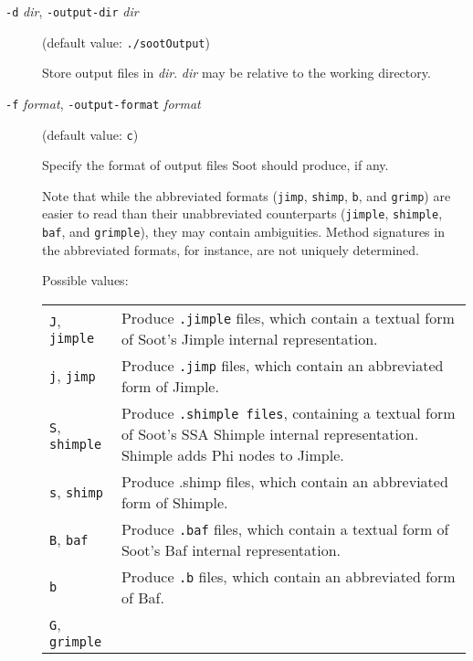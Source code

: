 \documentclass{article}
\begin{document}
\begin{description}

  \item[
  {\tt -d}{ \it dir}, 
  {\tt -output-dir}{ \it dir}]

(default value: {\tt ./sootOutput})

Store output files in {\it dir}. {\it dir} may be
relative to the working directory.



  \item[
  {\tt -f}{ \it format}, 
  {\tt -output-format}{ \it format}]

(default value: {\tt c})


\par

Specify the format of output files Soot should produce, if
any.

\par

Note that while the abbreviated formats ({\tt jimp},
{\tt shimp}, {\tt b}, and {\tt grimp}) are easier to
read than their unabbreviated counterparts ({\tt jimple},
{\tt shimple}, {\tt baf}, and {\tt grimple}), they may
contain ambiguities. Method signatures in the abbreviated
formats, for instance, are not uniquely determined.




Possible values:\\
\begin{longtable}{p{1in}p{4in}}
{\tt J}, {\tt jimple} 
&

Produce {\tt .jimple} files, which contain a textual
form of Soot's Jimple internal representation.
\\
{\tt j}, {\tt jimp} 
&

Produce {\tt .jimp} files, which contain an abbreviated form
of Jimple.
\\
{\tt S}, {\tt shimple} 
&

Produce {\tt .shimple files}, containing a textual form of
Soot's SSA Shimple internal representation.  Shimple adds
Phi nodes to Jimple.
\\
{\tt s}, {\tt shimp} 
&

Produce .shimp files, which contain an abbreviated form of
Shimple.
\\
{\tt B}, {\tt baf} 
&

Produce {\tt .baf} files, which contain a textual form of
Soot's Baf internal representation.
\\
{\tt b} 
&

Produce {\tt .b} files, which contain an abbreviated form of Baf. 
\\
{\tt G}, {\tt grimple} 
&


\end{longtable}
\end{description}
\end{document}
